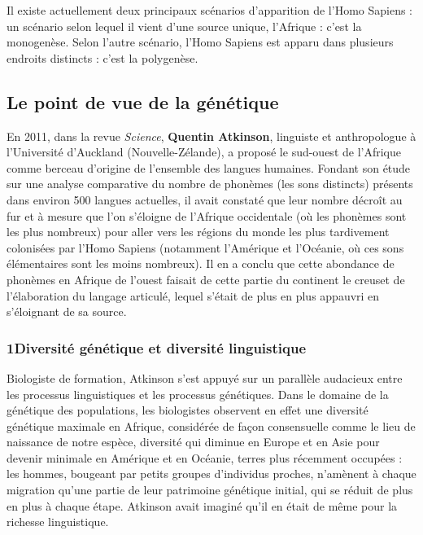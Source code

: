 Il existe actuellement deux principaux scénarios d’apparition de l’Homo Sapiens : un scénario selon lequel il vient d’une source unique, l’Afrique : c’est la monogenèse. Selon l’autre scénario, l’Homo Sapiens est apparu dans plusieurs endroits distincts : c’est la polygenèse.
\subsection[Le point de vue de la génétique]{Le point de vue de la génétique}
En 2011, dans la revue \textit{Science}, \textbf{Quentin Atkinson}, linguiste et anthropologue à l’Université d’Auckland (Nouvelle-Zélande), a proposé le sud-ouest de l’Afrique comme berceau d’origine de l’ensemble des langues humaines. Fondant son étude sur une analyse comparative du nombre de phonèmes (les sons distincts) présents dans environ 500 langues actuelles, il avait constaté que leur nombre décroît au fur et à mesure que l’on s’éloigne de l’Afrique occidentale (où les phonèmes sont les plus nombreux) pour aller vers les régions du monde les plus tardivement colonisées par l’Homo Sapiens (notamment l’Amérique et l’Océanie, où ces sons élémentaires sont les moins nombreux). Il en a conclu que cette abondance de phonèmes en Afrique de l’ouest faisait de cette partie du continent le creuset de l’élaboration du langage articulé, lequel s’était de plus en plus appauvri en s’éloignant de sa source.
\subsubsection*{1\quad Diversité génétique et diversité linguistique}
Biologiste de formation, Atkinson s’est appuyé sur un parallèle audacieux entre les processus linguistiques et les processus génétiques. Dans le domaine de la génétique des populations, les biologistes observent en effet une diversité génétique maximale en Afrique, considérée de façon consensuelle comme le lieu de naissance de notre espèce, diversité qui diminue en Europe et en Asie pour devenir minimale en Amérique et en Océanie, terres plus récemment occupées : les hommes, bougeant par petits groupes d’individus proches, n’amènent à chaque migration qu’une partie de leur patrimoine génétique initial, qui se réduit de plus en plus à chaque étape. Atkinson avait imaginé qu’il en était de même pour la richesse linguistique.
